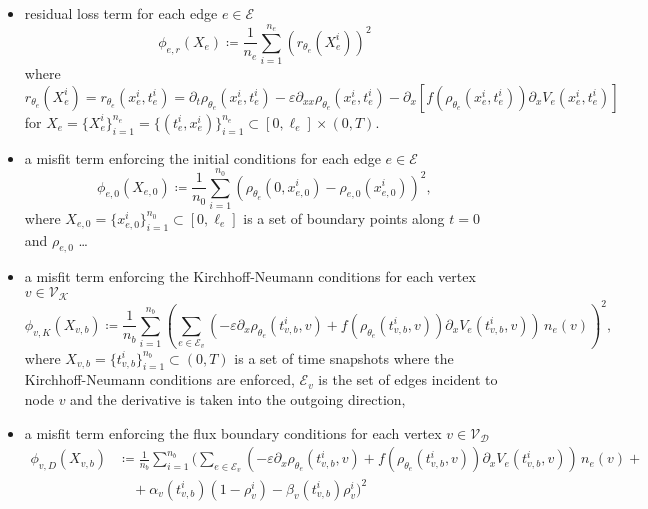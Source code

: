 \begin{itemize}
    \item residual loss term for each edge $e \in \mathcal{E}$ \begin{equation*} \phi_{e,r} (X_e) \coloneqq \frac{1}{n_e} \sum_{i=1}^{n_e} (r_{\theta_e} (X_e^i))^2 \end{equation*} where \begin{equation*} r_{\theta_e} (X_e^i) = r_{\theta_e} (x_e^i, t_e^i) = \partial_t \rho_{\theta_{e}} (x_{e}^i , t_{e}^i) - \varepsilon \partial_{xx} \rho_{\theta_e}(x_e^i, t_e^i) - \partial_x [f(\rho_{\theta_e}(x_e^i, t_e^i)) \partial_x V_e(x_e^i, t_e^i)] \end{equation*} for $X_e = \{X_e^i\}_{i=1}^{n_e} = \{(t_e^i, x_e^i)\}_{i=1}^{n_e} \subset [0,\ell_e] \times (0, T)$.
    \item a misfit term enforcing the initial conditions for each edge $e \in \mathcal{E}$ \begin{equation*} \phi_{e,0} (X_{e,0}) \coloneqq \frac{1}{n_0} \sum_{i=1}^{n_0} (\rho_{\theta_e} (0,x_{e,0}^i) - \rho_{e,0}(x_{e,0}^i))^2, \end{equation*} where $X_{e,0} = \{x_{e,0}^i\}_{i=1}^{n_0} \subset [0, \ell_e]$ is a set of boundary points along $t=0$ and $\rho_{e,0}$ \ldots
    \item a misfit term enforcing the Kirchhoff-Neumann conditions for each vertex $v \in \mathcal{V}_\mathcal{K}$ \begin{equation*} \phi_{v,K} (X_{v,b}) \coloneqq \frac{1}{n_b} \sum_{i=1}^{n_b} (\sum_{e \in \mathcal{E}_v} (- \varepsilon \partial_x \rho_{\theta_e} (t_{v,b}^i, v) + f(\rho_{\theta_e} (t_{v,b}^i, v)) \partial_x V_e(t_{v,b}^i, v)) \, n_e (v))^2, \end{equation*} where $X_{v,b} = \{t_{v,b}^i\}_{i=1}^{n_b} \subset (0,T)$ is a set of time snapshots where the Kirchhoff-Neumann conditions are enforced, $\mathcal{E}_v$ is the set of edges incident to node $v$ and the derivative is taken into the outgoing direction,
    \item a misfit term enforcing the flux boundary conditions for each vertex $v \in \mathcal{V}_\mathcal{D}$ \begin{align*} \phi_{v,D} (X_{v,b}) & \coloneqq \frac{1}{n_b} \sum_{i=1}^{n_b} ( \sum_{e\in \mathcal{E}_v} (-\varepsilon \partial_x \rho_{\theta_e} (t_{v,b}^i, v) + f(\rho_{\theta_e} (t_{v,b}^i, v)) \partial_x V_e(t_{v,b}^i, v)) \, n_e (v) + \\ & \quad + \alpha_v(t_{v,b}^i) (1-\rho_v^i) - \beta_v(t_{v,b}^i) \rho_v^i)^2 \end{align*}

\end{itemize}
